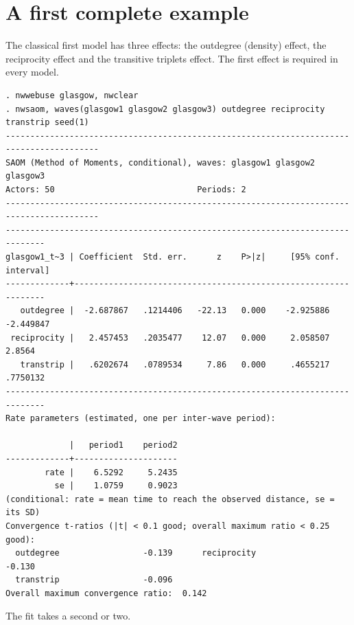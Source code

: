 \section{A first complete example}\label{sec:firstexample}

The classical first model has three effects: the outdegree (density) effect, the reciprocity effect and the transitive triplets effect. The first effect is required in every model.
\begin{lstlisting}
. nwwebuse glasgow, nwclear
. nwsaom, waves(glasgow1 glasgow2 glasgow3) outdegree reciprocity transtrip seed(1)
-----------------------------------------------------------------------------------------
SAOM (Method of Moments, conditional), waves: glasgow1 glasgow2 glasgow3
Actors: 50                             Periods: 2
-----------------------------------------------------------------------------------------
------------------------------------------------------------------------------
glasgow1_t~3 | Coefficient  Std. err.      z    P>|z|     [95% conf. interval]
-------------+----------------------------------------------------------------
   outdegree |  -2.687867   .1214406   -22.13   0.000    -2.925886   -2.449847
 reciprocity |   2.457453   .2035477    12.07   0.000     2.058507      2.8564
   transtrip |   .6202674   .0789534     7.86   0.000     .4655217    .7750132
------------------------------------------------------------------------------
Rate parameters (estimated, one per inter-wave period):

             |   period1    period2
-------------+---------------------
        rate |    6.5292     5.2435
          se |    1.0759     0.9023
(conditional: rate = mean time to reach the observed distance, se = its SD)
Convergence t-ratios (|t| < 0.1 good; overall maximum ratio < 0.25 good):
  outdegree                 -0.139      reciprocity               -0.130
  transtrip                 -0.096
Overall maximum convergence ratio:  0.142
\end{lstlisting}
The fit takes a second or two.

